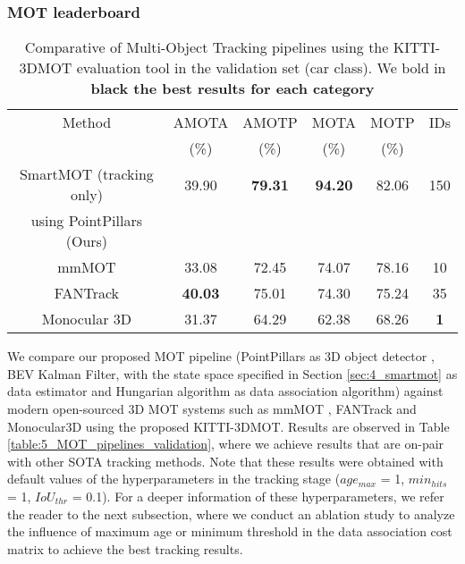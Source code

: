 \subsubsection{MOT leaderboard}
\label{subsubsec:4_mot_leaderboard}

\begin{table}[h]
	\caption{Comparative of Multi-Object Tracking pipelines using the KITTI-3DMOT evaluation tool in the validation set (car class). We bold in \bf{black} the best results for each category}
	\label{table:4_MOT_pipelines_validation}
	\begin{center}
		\begin{tabular}{|c|c|c|c|c|c|}
			\hline
			Method & AMOTA &  AMOTP &  MOTA &  MOTP & IDs\\
			& (\%) & (\%) & (\%) & (\%) & \\
			\hline
			SmartMOT \cite{gomez2021smartmot} (tracking only) & 39.90 & \bf{79.31} & \bf{94.20} & 82.06 & 150 \\ 
			using PointPillars \cite{lang2019pointpillars} (Ours) & & & & & \\ \hline
			mmMOT \cite{zhang2019robust} & 33.08 & 72.45 & 74.07 & 78.16 & 10  \\ \hline
			FANTrack \cite{baser2019fantrack} & \bf{40.03} & 75.01 & 74.30 & 75.24 & 35 \\ \hline
			Monocular 3D \cite{weng2019monocular} & 31.37 & 64.29 & 62.38 & 68.26 & \bf{1} \\ \hline
		\end{tabular}
	\end{center}
\end{table}

We compare our proposed \ac{MOT} pipeline (PointPillars as 3D object detector \cite{lang2019pointpillars}, \ac{BEV} Kalman Filter, with the state space specified in Section \ref{sec:4_smartmot} as data estimator and Hungarian algorithm as data association algorithm) against modern open-sourced 3D MOT systems such as mmMOT \cite{zhang2019robust}, FANTrack \cite{baser2019fantrack} and Monocular3D \cite{weng2019monocular} using the proposed KITTI-3DMOT. Results are observed in Table \ref{table:5_MOT_pipelines_validation}, where we achieve results that are on-pair with other \ac{SOTA} tracking methods. Note that these results were obtained with default values of the hyperparameters in the tracking stage ($age_{max}$ = 1, $min_{hits}$ = 1, $IoU_{thr}$ = 0.1). For a deeper information of these hyperparameters, we refer the reader to the next subsection, where we conduct an ablation study to analyze the influence of maximum age or minimum threshold in the data association cost matrix to achieve the best tracking results.

